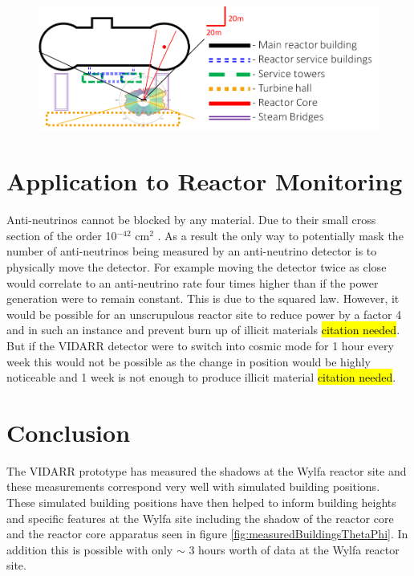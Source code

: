 \documentclass[12pt,a4paper]{article}
\begin{document}
\begin{figure}[H]
 \centering
 \includegraphics[width=1.0\linewidth]{greyscaleFriendlyTrace/wylfaTraceOfBuildingsRedo+Overlay.png}
 \label{fig:wylfaTraceOfBuildings+overlay}
\end{figure}

\section{Application to Reactor Monitoring} \label{sec:ApplicationToReactorMonitoring}
Anti-neutrinos cannot be blocked by any material. Due to their small cross section of the order 10$^{-42}$ cm$^2$ \cite{Vogel_1999}. As a result the only way to potentially mask the number of anti-neutrinos being measured by an anti-neutrino detector is to physically move the detector. For example moving the detector twice as close would correlate to an anti-neutrino rate four times higher than if the power generation were to remain constant. This is due to the squared law. However, it would be possible for an unscrupulous reactor site to reduce power by a factor 4 and in such an instance and prevent burn up of illicit materials \hl{citation needed}. But if the VIDARR detector were to switch into cosmic mode for 1 hour every week this would not be possible as the change in position would be highly noticeable and 1 week is not enough to produce illicit material \hl{citation needed}. 

\section{Conclusion} \label{sec:Conclusion}
 The VIDARR prototype has measured the shadows at the Wylfa reactor site and these measurements correspond very well with simulated building positions. These simulated building positions have then helped to inform building heights and specific features at the Wylfa site including the shadow of the reactor core and the reactor core apparatus seen in figure \ref{fig:measuredBuildingsThetaPhi}. In addition this is possible with only $\sim$ 3 hours worth of data at the Wylfa reactor site. 
\end{document}
